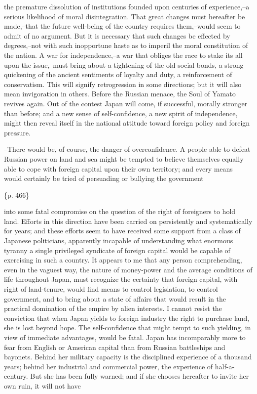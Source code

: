 the premature dissolution of institutions founded upon centuries of experience,--a serious likelihood of moral disintegration. That great changes must hereafter be made,--that the future well-being of the country requires them,--would seem to admit of no argument. But it is necessary that such changes be effected by degrees,--not with such inopportune haste as to imperil the moral constitution of the nation. A war for independence,--a war that obliges the race to stake its all upon the issue,--must bring about a tightening of the old social bonds, a strong quickening of the ancient sentiments of loyalty and duty, a reinforcement of conservatism. This will signify retrogression in some directions; but it will also mean invigoration in others. Before the Russian menace, the Soul of Yamato revives again. Out of the contest Japan will come, if successful, morally stronger than before; and a new sense of self-confidence, a new spirit of independence, might then reveal itself in the national attitude toward foreign policy and foreign pressure.



--There would be, of course, the danger of overconfidence. A people able to defeat Russian power on land and sea might be tempted to believe themselves equally able to cope with foreign capital upon their own territory; and every means would certainly be tried of persuading or bullying the government

\{p. 466\}

into some fatal compromise on the question of the right of foreigners to hold land. Efforts in this direction have been carried on persistently and systematically for years; and these efforts seem to have received some support from a class of Japanese politicians, apparently incapable of understanding what enormous tyranny a single privileged syndicate of foreign capital would be capable of exercising in such a country. It appears to me that any person comprehending, even in the vaguest way, the nature of money-power and the average conditions of life throughout Japan, must recognize the certainty that foreign capital, with right of land-tenure, would find means to control legislation, to control government, and to bring about a state of affairs that would result in the practical domination of the empire by alien interests. I cannot resist the conviction that when Japan yields to foreign industry the right to purchase land, she is lost beyond hope. The self-confidence that might tempt to such yielding, in view of immediate advantages, would be fatal. Japan has incomparably more to fear from English or American capital than from Russian battleships and bayonets. Behind her military capacity is the disciplined experience of a thousand years; behind her industrial and commercial power, the experience of half-a-century. But she has been fully warned; and if she chooses hereafter to invite her own ruin, it will not have


